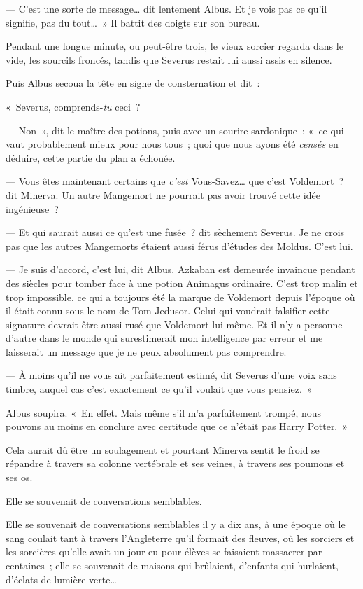 --- C'est une sorte de message… dit lentement Albus.
Et je vois pas ce qu'il signifie, pas du tout…~»
 Il battit des doigts sur son bureau.

Pendant une longue minute, ou peut-être trois, le vieux sorcier regarda dans le vide, les sourcils froncés, tandis que Severus restait lui aussi assis en silence.

Puis Albus secoua la tête en signe de consternation et dit~:

«~Severus, comprends-\emph{tu} ceci~?

--- Non~», dit le maître des potions, puis avec un sourire sardonique~: «~ce qui vaut probablement mieux pour nous tous~; quoi que nous ayons été \emph{censés} en déduire, cette partie du plan a échouée.

--- Vous êtes maintenant certains que \emph{c'est} Vous-Savez… que c'est Voldemort~? dit Minerva.
Un autre Mangemort ne pourrait pas avoir trouvé cette idée ingénieuse~?

--- Et qui saurait aussi ce qu'est une fusée~? dit sèchement Severus.
Je ne crois pas que les autres Mangemorts étaient aussi férus d'études des Moldus.
C'est lui.

--- Je suis d'accord, c'est lui, dit Albus.
Azkaban est demeurée invaincue pendant des siècles pour tomber face à une potion Animagus ordinaire.
C'est trop malin et trop impossible, ce qui a toujours été la marque de Voldemort depuis l'époque où il était connu sous le nom de Tom Jedusor.
Celui qui voudrait falsifier cette signature devrait être aussi rusé que Voldemort lui-même.
Et il n'y a personne d'autre dans le monde qui surestimerait mon intelligence par erreur et me laisserait un message que je ne peux absolument pas comprendre.

--- À moins qu'il ne vous ait parfaitement estimé, dit Severus d'une voix sans timbre, auquel cas c'est exactement ce qu'il voulait que vous pensiez.~»

Albus soupira.
«~En effet.
Mais même s'il m'a parfaitement trompé, nous pouvons au moins en conclure avec certitude que ce n'était pas Harry Potter.~»

Cela aurait dû être un soulagement et pourtant Minerva sentit le froid se répandre à travers sa colonne vertébrale et ses veines, à travers ses poumons et ses os.

Elle se souvenait de conversations semblables.

Elle se souvenait de conversations semblables il y a dix ans, à une époque où le sang coulait tant à travers l'Angleterre qu'il formait des fleuves, où les sorciers et les sorcières qu'elle avait un jour eu pour élèves se faisaient massacrer par centaines~; elle se souvenait de maisons qui brûlaient, d'enfants qui hurlaient, d'éclats de lumière verte…

